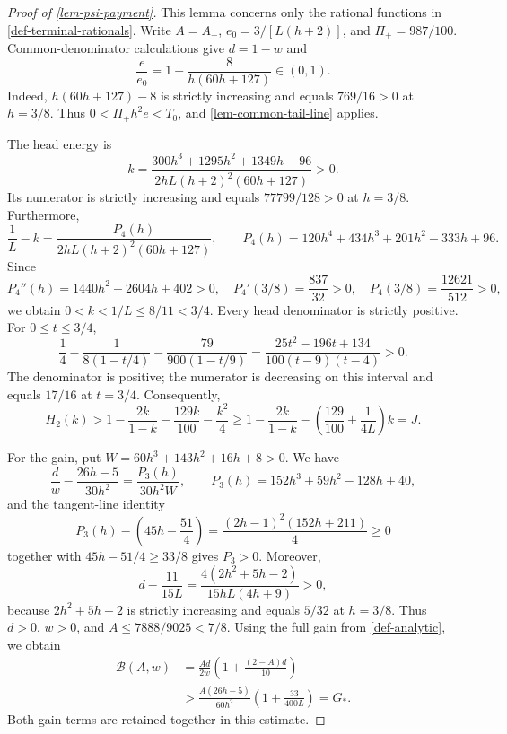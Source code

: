 \documentclass[11pt,a4paper]{article}
\theoremstyle{proofmanuscript}
\begin{document}
\begin{proof}[Proof of \ref{lem-psi-payment}]

This lemma concerns only the rational functions in \ref{def-terminal-rationals}. Write \(A=A_-\), \(e_0=3/[L(h+2)]\), and \(\Pi_+=987/100\). Common-denominator calculations give \(d=1-w\) and \[
\frac e{e_0}=1-\frac8{h(60h+127)}\in(0,1).
\] Indeed, \(h(60h+127)-8\) is strictly increasing and equals \(769/16>0\) at \(h=3/8\). Thus \(0<\Pi_+h^2e<T_0\), and \ref{lem-common-tail-line} applies.

The head energy is \[
k=\frac{300h^3+1295h^2+1349h-96}
{2hL(h+2)^2(60h+127)}>0.
\] Its numerator is strictly increasing and equals \(77799/128>0\) at \(h=3/8\). Furthermore, \[
\frac1L-k=\frac{P_4(h)}{2hL(h+2)^2(60h+127)},\qquad
P_4(h)=120h^4+434h^3+201h^2-333h+96.
\] Since \[
P_4''(h)=1440h^2+2604h+402>0,\quad
P_4'(3/8)=\frac{837}{32}>0,\quad
P_4(3/8)=\frac{12621}{512}>0,
\] we obtain \(0<k<1/L\le8/11<3/4\). Every head denominator is strictly positive. For \(0\le t\le3/4\), \[
\frac14-\frac1{8(1-t/4)}-\frac{79}{900(1-t/9)}
=\frac{25t^2-196t+134}{100(t-9)(t-4)}>0.
\] The denominator is positive; the numerator is decreasing on this interval and equals \(17/16\) at \(t=3/4\). Consequently, \[
H_2(k)>1-\frac{2k}{1-k}-\frac{129k}{100}-\frac{k^2}{4}
\ge1-\frac{2k}{1-k}-\left(\frac{129}{100}+\frac1{4L}\right)k=J.
\]

For the gain, put \(W=60h^3+143h^2+16h+8>0\). We have \[
\frac dw-\frac{26h-5}{30h^2}
=\frac{P_3(h)}{30h^2W},\qquad P_3(h)=152h^3+59h^2-128h+40,
\] and the tangent-line identity \[
P_3(h)-\left(45h-\frac{51}{4}\right)
=\frac{(2h-1)^2(152h+211)}4\ge0
\] together with \(45h-51/4\ge33/8\) gives \(P_3>0\). Moreover, \[
d-\frac{11}{15L}=\frac{4(2h^2+5h-2)}{15hL(4h+9)}>0,
\] because \(2h^2+5h-2\) is strictly increasing and equals \(5/32\) at \(h=3/8\). Thus \(d>0\), \(w>0\), and \(A\le7888/9025<7/8\). Using the full gain from \ref{def-analytic}, we obtain \[
\begin{aligned}
\mathcal B(A,w)
&=\frac{Ad}{2w}\left(1+\frac{(2-A)d}{10}\right)\\
&>\frac{A(26h-5)}{60h^2}
\left(1+\frac{33}{400L}\right)=G_*.
\end{aligned}
\] Both gain terms are retained together in this estimate.


\end{proof}
\end{document}
